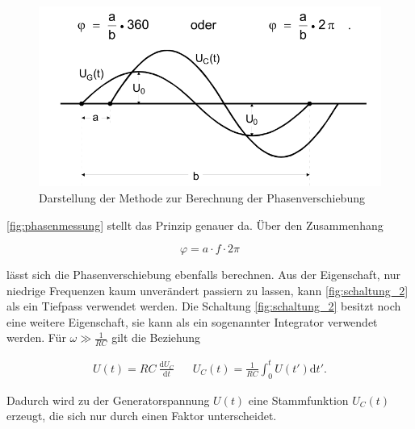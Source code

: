 \begin{figure}
    \centering
    \includegraphics[width=\textwidth/2]{images/phasenmessung.png}
    \caption{Darstellung der Methode zur Berechnung der Phasenverschiebung  \cite{V353}}
    \label{fig:phasenmessung}
\end{figure}

\autoref{fig:phasenmessung} stellt das Prinzip genauer da. Über den Zusammenhang

\begin{equation}
    \label{eq:phasenverschiebung2}
    \varphi = a \cdot f \cdot 2\pi
\end{equation}

lässt sich die Phasenverschiebung ebenfalls berechnen.
Aus der Eigenschaft, nur niedrige Frequenzen kaum unverändert passiern zu lassen, kann \autoref{fig:schaltung_2} als ein Tiefpass verwendet werden. \cite{V353}
Die Schaltung \autoref{fig:schaltung_2} besitzt noch eine weitere Eigenschaft, sie kann als ein sogenannter Integrator verwendet werden. Für $\omega \gg \frac{1}{RC}$ gilt die Beziehung

\begin{align}
    \label{eq:integrator}
    U (t) = RC \: \frac{\mathrm{d} U_C}{\mathrm{d}t}  && U_C (t) = \frac{1}{RC} \int _0^t U (t') \mathrm{d} t'.
\end{align}

Dadurch wird zu der Generatorspannung $U (t)$ eine Stammfunktion $U_C (t)$ erzeugt, die sich nur durch einen Faktor unterscheidet. \cite{V353}
